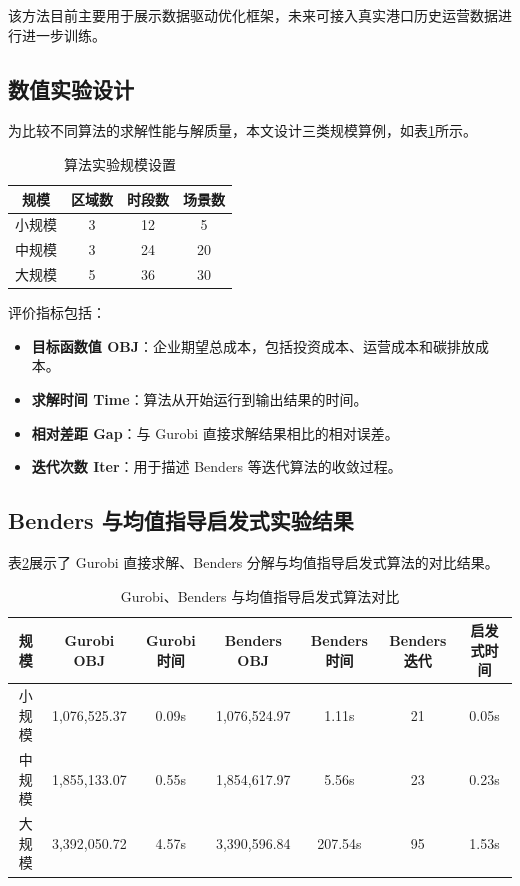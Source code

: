 \documentclass[12pt,a4paper]{article}
\newcommand{\手批注}[2]{\textcolor{#1}{\text{\kaishu #2}}}
\newcommand{\一阶段}{\textcolor{firststage}{\text{\kaishu （一阶段）}}}
\newcommand{\二阶段}{\textcolor{secondstage}{\text{\kaishu （二阶段）}}}
\begin{document}
该方法目前主要用于展示数据驱动优化框架，未来可接入真实港口历史运营数据进行进一步训练。

\subsection{数值实验设计}

为比较不同算法的求解性能与解质量，本文设计三类规模算例，如表\ref{tab:algo-scale}所示。

\begin{table}[htbp]
\centering
\caption{算法实验规模设置}
\label{tab:algo-scale}
\begin{tabular}{cccc}
\toprule
规模 & 区域数 & 时段数 & 场景数 \\
\midrule
小规模 & 3 & 12 & 5 \\
中规模 & 3 & 24 & 20 \\
大规模 & 5 & 36 & 30 \\
\bottomrule
\end{tabular}
\end{table}

评价指标包括：
\begin{itemize}[itemsep=0.2em,leftmargin=2em]
    \item \textbf{目标函数值 OBJ}：企业期望总成本，包括投资成本、运营成本和碳排放成本。
    \item \textbf{求解时间 Time}：算法从开始运行到输出结果的时间。
    \item \textbf{相对差距 Gap}：与 Gurobi 直接求解结果相比的相对误差。
    \item \textbf{迭代次数 Iter}：用于描述 Benders 等迭代算法的收敛过程。
\end{itemize}

\subsection{Benders 与均值指导启发式实验结果}

表\ref{tab:benders-heuristic}展示了 Gurobi 直接求解、Benders 分解与均值指导启发式算法的对比结果。

\begin{table}[htbp]
\centering
\caption{Gurobi、Benders 与均值指导启发式算法对比}
\label{tab:benders-heuristic}
\begin{tabular}{ccccccc}
\toprule
规模 & Gurobi OBJ & Gurobi时间 & Benders OBJ & Benders时间 & Benders迭代 & 启发式时间 \\
\midrule
小规模 & 1,076,525.37 & 0.09s & 1,076,524.97 & 1.11s & 21 & 0.05s \\
中规模 & 1,855,133.07 & 0.55s & 1,854,617.97 & 5.56s & 23 & 0.23s \\
大规模 & 3,392,050.72 & 4.57s & 3,390,596.84 & 207.54s & 95 & 1.53s \\
\bottomrule
\end{tabular}
\end{table}
\end{document}
